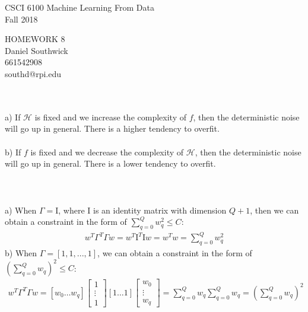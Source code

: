 \documentclass[12pt]{article}
\begin{document}
\begin{center}
CSCI 6100 Machine Learning From Data\\
Fall 2018\\
\end{center}
\begin{center}
HOMEWORK 8\\
Daniel Southwick\\
661542908\\
southd@rpi.edu
\end{center}
\vspace{.1in}

 \\\\
\indent a) If $\mathcal{H}$ is fixed and we increase the complexity of $f$, then the deterministic noise will go up in general. There is a higher tendency to overfit. \\\\
\indent b) If $f$ is fixed and we decrease the complexity of $\mathcal{H}$, then the deterministic noise will go up in general. There is a lower tendency to overfit. \\\\

 \\\\
\indent a) When $\Gamma = \mathrm{I}$, where $\mathrm{I}$ is an identity matrix with dimension $Q+1$, then we can obtain a constraint in the form of $\displaystyle \sum_{q =0}^Q w_q^2 \leq C$: \begin{align*}
\displaystyle {w}^T\Gamma^T\Gamma {w} =  {w}^T\mathrm{I}^T\mathrm{I} {w} =  {w}^T {w} = \sum_{q =0}^Q w_q^2
\end{align*} 
\indent b) When $\Gamma = \left[1,1,...,1\right]$, we can obtain a constraint in the form of $\displaystyle (\sum_{q =0}^Q w_q)^2 \leq C$:
\begin{align*}
\displaystyle  {w}^T\Gamma^T\Gamma  {w} = [w_0\dots w_q]\left[\begin{array}{c}1\\\vdots\\1\end{array}\right][1\dots1]\left[\begin{array}{c}w_0\\\vdots\\w_q\end{array}\right] = \sum_{q =0}^Q w_q \sum_{q =0}^Q w_q = \left(\sum_{q =0}^Q w_q\right)^2
\end{align*} 
\end{document}
